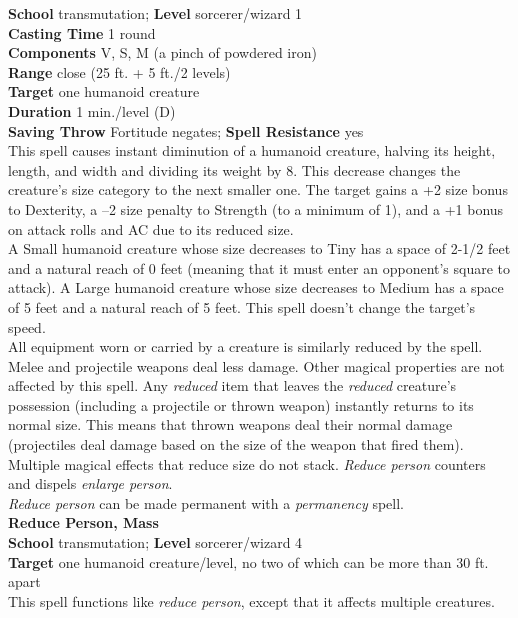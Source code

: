 \textbf{School} transmutation; \textbf{Level} sorcerer/wizard 1\\
\textbf{Casting Time} 1 round\\
\textbf{Components} V, S, M (a pinch of powdered iron)\\
\textbf{Range} close (25 ft. + 5 ft./2 levels)\\
\textbf{Target} one humanoid creature\\
\textbf{Duration} 1 min./level (D)\\
\textbf{Saving Throw} Fortitude negates; \textbf{Spell Resistance} yes\\
This spell causes instant diminution of a humanoid creature, halving its height, length, and width and dividing its weight by 8. This decrease changes the creature's size category to the next smaller one. The target gains a +2 size bonus to Dexterity, a --2 size penalty to Strength (to a minimum of 1), and a +1 bonus on attack rolls and AC due to its reduced size.\\
A Small humanoid creature whose size decreases to Tiny has a space of 2-1/2 feet and a natural reach of 0 feet (meaning that it must enter an opponent's square to attack). A Large humanoid creature whose size decreases to Medium has a space of 5 feet and a natural reach of 5 feet. This spell doesn't change the target's speed.\\
All equipment worn or carried by a creature is similarly reduced by the spell.\\
Melee and projectile weapons deal less damage. Other magical properties are not affected by this spell. Any \textit{reduced }item that leaves the \textit{reduced }creature's possession (including a projectile or thrown weapon) instantly returns to its normal size. This means that thrown weapons deal their normal damage (projectiles deal damage based on the size of the weapon that fired them).\\
Multiple magical effects that reduce size do not stack. \textit{Reduce person }counters and dispels \textit{enlarge person}.\\
\textit{Reduce person }can be made permanent with a \textit{permanency }spell.\\
\textbf{Reduce Person, Mass}\\
\textbf{School} transmutation; \textbf{Level} sorcerer/wizard 4\\
\textbf{Target} one humanoid creature/level, no two of which can be more than 30 ft. apart\\
This spell functions like \textit{reduce person}, except that it affects multiple creatures.\\
